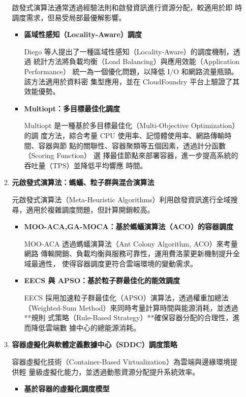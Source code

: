 \documentclass[12pt,a4paper]{article}
\begin{document}
\begin{enumerate}[label={(\zhdig*)}, leftmargin=2\parindent, listparindent=\parindent]
\begin{enumerate}[label={(\arabic*)}, leftmargin=\parindent, listparindent=\parindent]
啟發式演算法通常透過經驗法則和啟發資訊進行資源分配，較適用於即
時調度需求，但易受局部最優解影響。
\begin{itemize}[leftmargin=\parindent, listparindent=\parindent]
    \item \textbf{
\cite{11} 區域性感知（Locality-Aware）調度}

Diego 等人提出了一種區域性感知（Locality-Aware）的調度機制，透過
統計方法將負載均衡（Load Balancing）與應用效能（Application Performance）
統一為一個優化問題，以降低 I/O 和網路流量瓶頸。該方法適用於資料密
集型應用，並在 CloudFoundry 平台上驗證了其效能優勢。
\item \textbf{
\cite{12} Multiopt：多目標最佳化調度
}

Multiopt 是一種基於多目標最佳化（Multi-Objective Optimization）的調
度方法，綜合考量 CPU 使用率、記憶體使用率、網路傳輸時間、容器與節
點的關聯性、容器聚類等五個因素，透過計分函數（Scoring Function） 選
擇最佳節點來部署容器，進一步提高系統的吞吐量（TPS）並降低平均響應
時間。

    \end{itemize}
    \item \textbf{
元啟發式演算法：螞蟻、粒子群與混合演算法
}

元啟發式演算法（Meta-Heuristic Algorithms）利用啟發資訊進行全域搜
尋，適用於複雜調度問題，但計算開銷較高。
\begin{itemize}[leftmargin=\parindent, listparindent=\parindent]
    \item \textbf{
\cite{13} MOO-ACA,GA-MOCA：基於螞蟻演算法（ACO）的容器調度}

MOO-ACA 透過螞蟻演算法（Ant Colony Algorithm, ACO）來考量網路
傳輸開銷、負載均衡與服務可靠性，運用費洛蒙更新機制提升全域最適性，
使得容器調度更符合雲端環境的變動需求。

    \item \textbf{
\cite{14} EECS 與 APSO：基於粒子群最佳化的能效調度
}

EECS 採用加速粒子群最佳化（APSO）演算法，透過權重加總法
（Weighted-Sum Method）來同時考量計算時間與能源消耗，並透過**規則
式策略（Rule-Based Strategy）**確保容器分配的合理性，進而降低雲端數
據中心的總能源消耗。

\end{itemize}
    \item \textbf{
容器虛擬化與軟體定義數據中心（SDDC）調度策略
}

容器虛擬化技術（Container-Based Virtualization）為雲端與邊緣環境提供輕
量級虛擬化能力，並透過動態資源分配提升系統效率。
\begin{itemize}[leftmargin=\parindent, listparindent=\parindent]
    \item \textbf{
\cite{15} 基於容器的虛擬化調度模型
    }


\end{itemize}
\end{enumerate}
\end{enumerate}
\end{document}
